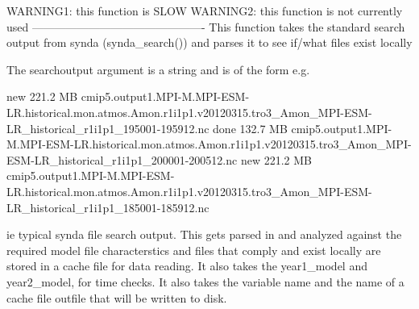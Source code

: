 \documentclass[letterpaper,10pt,english]{sphinxmanual}
\begin{document}
\begin{fulllineitems}
\label{\detokenize{index:cmip5datafinder.write_cache_via_synda}}
WARNING1: this function is SLOW
WARNING2: this function is not currently used
----------------------------------------------
This function takes the standard search output from synda (synda\_search())
and parses it to see if/what files exist locally

The searchoutput argument is a string and is of the form e.g.

new   221.2 MB  cmip5.output1.MPI-M.MPI-ESM-LR.historical.mon.atmos.Amon.r1i1p1.v20120315.tro3\_Amon\_MPI-ESM-LR\_historical\_r1i1p1\_195001-195912.nc
done  132.7 MB  cmip5.output1.MPI-M.MPI-ESM-LR.historical.mon.atmos.Amon.r1i1p1.v20120315.tro3\_Amon\_MPI-ESM-LR\_historical\_r1i1p1\_200001-200512.nc
new   221.2 MB  cmip5.output1.MPI-M.MPI-ESM-LR.historical.mon.atmos.Amon.r1i1p1.v20120315.tro3\_Amon\_MPI-ESM-LR\_historical\_r1i1p1\_185001-185912.nc

ie typical synda file search output. This gets parsed in and analyzed
against the required model file characterstics and files that comply and
exist locally are stored in a cache file for data reading. It also takes the year1\_model and year2\_model, for time checks.
It also takes the variable name and the name of a cache file outfile that will be written to disk.

\end{fulllineitems}
\end{document}
